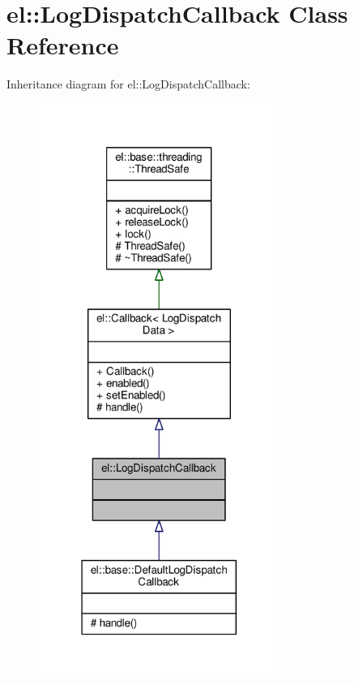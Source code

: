 \hypertarget{classel_1_1LogDispatchCallback}{}\section{el\+:\+:Log\+Dispatch\+Callback Class Reference}
\label{classel_1_1LogDispatchCallback}


Inheritance diagram for el\+:\+:Log\+Dispatch\+Callback\+:
\nopagebreak
\begin{figure}[H]
\begin{center}
\leavevmode
\includegraphics[width=223pt]{da/d2d/classel_1_1LogDispatchCallback__inherit__graph}
\end{center}
\end{figure}


